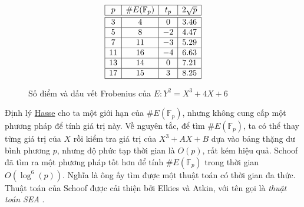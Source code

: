 \begin{figure}[H]
	\label{fg:tb2}
	\caption{Số điểm và dấu vết Frobenius của $E:Y^2 = X^3 + 4X + 6$}
	$$
		\begin{array}{|c|c|c|c|}
			\hline
			p  & \#E(\mathbb{F}_p) & t_p & 2\sqrt{p} \\
			\hline
			\hline
			3  & 4                 & 0   & 3.46      \\
			\hline
			5  & 8                 & -2  & 4.47      \\
			\hline
			7  & 11                & -3  & 5.29      \\
			\hline
			11 & 16                & -4  & 6.63      \\
			\hline
			13 & 14                & 0   & 7.21      \\
			\hline
			17 & 15                & 3   & 8.25      \\
			\hline
		\end{array}
	$$
\end{figure}

\begin{remark}
	Định lý \hyperref[th:th4]{Hasse} cho ta một giới hạn của $\#E(\mathbb{F}_p)$, nhưng không cung cấp một phương pháp để tính giá trị này.
	Về nguyên tắc, để tìm $\#E(\mathbb{F}_p)$, ta có thể thay từng giá trị của $X$ rồi kiểm tra giá trị của $X^3 + AX + B$ dựa vào bảng thặng dư bình phương $p$, nhưng độ phức tạp thời gian là $O(p)$, rất kém hiệu quả.
	Schoof \cite{schoof1985elliptic} đã tìm ra một phương pháp tốt hơn để tính $\#E(\mathbb{F}_p)$ trong thời gian $O(\log^6(p))$.
	Nghĩa là ông ấy tìm được một thuật toán có thời gian đa thức. Thuật toán của Schoof được cải thiện bởi Elkies và Atkin, với tên gọi là \textit{thuật toán SEA} \cite{schoof1995counting}.
\end{remark}